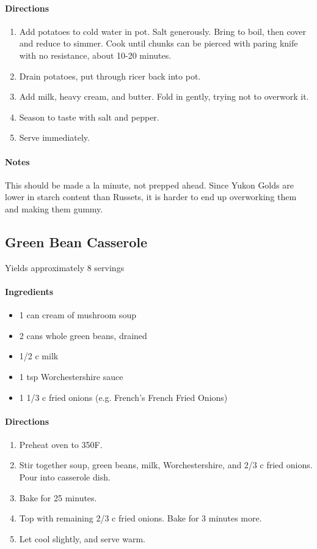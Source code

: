 \documentclass[12pt]{article}
\newenvironment*{ingredients}
	{
		\paragraph*{Ingredients}
		\begin{itemize}
	}
	{
		\end{itemize}
	}
\newenvironment*{directions}
	{
		\paragraph*{Directions}
		\begin{enumerate}
	}
	{
		\end{enumerate}
	}
\newenvironment*{notes}
	{
		\paragraph*{Notes}
		\begin{adjustwidth}{1cm}{}
	}
	{
		\end{adjustwidth}
	}
\begin{document}
	\begin{directions}
		\item Add potatoes to cold water in pot. Salt generously. Bring to boil, then cover and reduce to simmer. Cook until chunks can be pierced with paring knife with no resistance, about 10-20 minutes.
		\item Drain potatoes, put through ricer back into pot.
		\item Add milk, heavy cream, and butter. Fold in gently, trying not to overwork it.
		\item Season to taste with salt and pepper.
		\item Serve immediately.
	\end{directions}
	
	\begin{notes}
		This should be made a la minute, not prepped ahead. Since Yukon Golds are lower in starch content than Russets, it is harder to end up overworking them and making them gummy.
	\end{notes}
	
	\newpage
	
	\subsection{Green Bean Casserole}
	Yields approximately 8 servings
	
	\begin{ingredients}
		\item 1 can cream of mushroom soup
		\item 2 cans whole green beans, drained
		\item 1/2 c milk
		\item 1 tsp Worchestershire sauce
		\item 1 1/3 c fried onions (e.g. French's French Fried Onions)
	\end{ingredients}
	
	\begin{directions}
		\item Preheat oven to 350F.
		\item Stir together soup, green beans, milk, Worchestershire, and 2/3 c fried onions. Pour into casserole dish.
		\item Bake for 25 minutes.
		\item Top with remaining 2/3 c fried onions. Bake for 3 minutes more.
		\item Let cool slightly, and serve warm.
	\end{directions}
	
\end{document}

